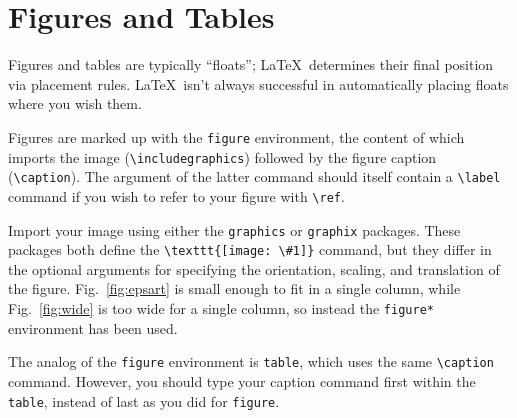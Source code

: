 \documentclass[%
 aapm,
 mph,%
 amsmath,amssymb,
 reprint,%
]{revtex4-2}
\begin{document}
\section{Figures and Tables}
Figures and tables are typically ``floats''; \LaTeX\ determines their
final position via placement rules. 
\LaTeX\ isn't always successful in automatically placing floats where you wish them.

Figures are marked up with the \texttt{figure} environment, the content of which
imports the image (\verb+\includegraphics+) followed by the figure caption (\verb+\caption+).
The argument of the latter command should itself contain a \verb+\label+ command if you
wish to refer to your figure with \verb+\ref+.

Import your image using either the \texttt{graphics} or
\texttt{graphix} packages. These packages both define the
\verb+\texttt{[image: \#1]}+ command, but they differ in the optional
arguments for specifying the orientation, scaling, and translation of the figure.
Fig.~\ref{fig:epsart}%
is small enough to fit in a single column, while
Fig.~\ref{fig:wide}%
is too wide for a single column,
so instead the \texttt{figure*} environment has been used.

The analog of the \texttt{figure} environment is \texttt{table}, which uses
the same \verb+\caption+ command.
However, you should type your caption command first within the \texttt{table}, 
instead of last as you did for \texttt{figure}.
\end{document}

